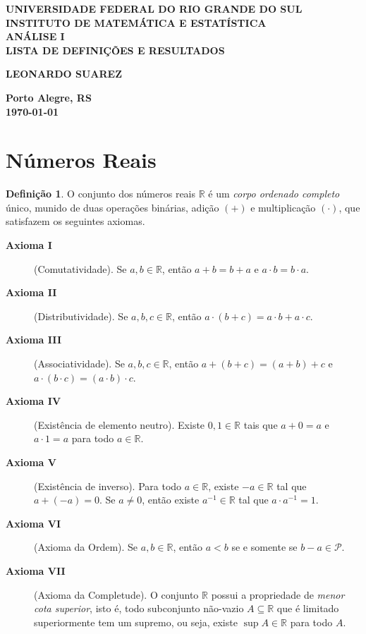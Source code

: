\documentclass[12pt]{article}
\theoremstyle{plain}
\theoremstyle{definition}
\newtheorem{defn}[thm]{Definição}
\theoremstyle{remark}
\begin{document}
\begin{center}
    \textbf{\large UNIVERSIDADE FEDERAL DO RIO GRANDE DO SUL} \\
    \textbf{\large INSTITUTO DE MATEMÁTICA E ESTATÍSTICA} \\
    \vspace{3cm}
    \textbf{\Large ANÁLISE I} \\
    \vspace{1cm}
    \textbf{\large LISTA DE DEFINIÇÕES E RESULTADOS} \\
    \vspace{3cm}

    \textbf{LEONARDO SUAREZ}

    \vfill
    \textbf{\large Porto Alegre, RS} \\
    \textbf{\large \today}
\end{center}

\newpage
\tableofcontents
\newpage

\section{Números Reais}

\begin{defn}
    O conjunto dos números reais \(\mathbb{R}\) é um \emph{corpo ordenado completo} único, munido de duas operações binárias, adição \(\left(+\right)\) e multiplicação \(\left(\cdot\right)\), que satisfazem os seguintes axiomas.
    \begin{description}
        \item[\textbf{Axioma I}] (Comutatividade). Se \(a, b \in \mathbb{R}\), então \(a + b = b + a\) e \(a \cdot b = b \cdot a\).
        \item[\textbf{Axioma II}] (Distributividade). Se \(a, b, c \in \mathbb{R}\), então \(a \cdot (b + c) = a \cdot b + a \cdot c\).
        \item[\textbf{Axioma III}] (Associatividade). Se \(a, b, c \in \mathbb{R}\), então \(a + (b + c) = (a + b) + c\) e \(a \cdot (b \cdot c) = (a \cdot b) \cdot c\).
        \item[\textbf{Axioma IV}] (Existência de elemento neutro). Existe \(0, 1 \in \mathbb{R}\) tais que \(a + 0 = a\) e \(a \cdot 1 = a\) para todo \(a \in \mathbb{R}\).
        \item[\textbf{Axioma V}] (Existência de inverso). Para todo \(a \in \mathbb{R}\), existe \(-a \in \mathbb{R}\) tal que \(a + (-a) = 0\). Se \(a \neq 0\), então existe \(a^{-1} \in \mathbb{R}\) tal que \(a \cdot a^{-1} = 1\).
        \item[\textbf{Axioma VI}] (Axioma da Ordem). Se \(a, b \in \mathbb{R}\), então \(a < b\) se e somente se \(b - a \in \mathcal{P}\).
        \item[\textbf{Axioma VII}] (Axioma da Completude). O conjunto \(\mathbb{R}\) possui a propriedade de \emph{menor cota superior}, isto é, todo subconjunto não-vazio \(A \subseteq \mathbb{R}\) que é limitado superiormente tem um supremo, ou seja, existe \(\sup A \in \mathbb{R}\) para todo \(A\).
    \end{description}
\end{defn}
\end{document}
